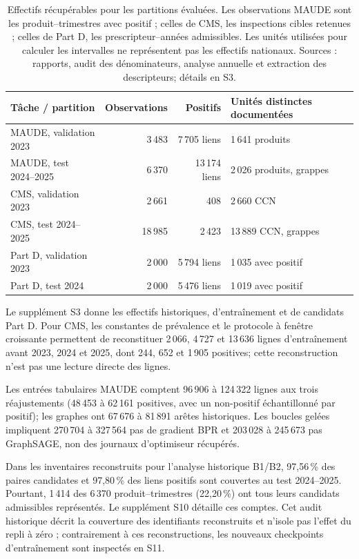 \begin{table}[!htbp]
\centering\footnotesize
\caption{Effectifs récupérables pour les partitions évaluées. Les observations MAUDE sont les produit--trimestres avec positif ; celles de CMS, les inspections cibles retenues ; celles de Part D, les prescripteur--années admissibles. Les unités utilisées pour calculer les intervalles ne représentent pas les effectifs nationaux. Sources : rapports, audit des dénominateurs, analyse annuelle et extraction des descripteurs\cite{hgbresults,hgbanalysis,hgbpartd}; détails en S3.}
\label{tab:population}
\begin{tabularx}{\linewidth}{@{}lrrX@{}}
\toprule
Tâche / partition & Observations & Positifs & Unités distinctes documentées\\
\midrule
MAUDE, validation 2023 & 3\,483 & 7\,705 liens & 1\,641 produits\\
MAUDE, test 2024--2025 & 6\,370 & 13\,174 liens & 2\,026 produits, grappes\\
CMS, validation 2023 & 2\,661 & 408 & 2\,660 CCN\\
CMS, test 2024--2025 & 18\,985 & 2\,423 & 13\,889 CCN, grappes\\
Part D, validation 2023 & 2\,000 & 5\,794 liens & 1\,035 avec positif\\
Part D, test 2024 & 2\,000 & 5\,476 liens & 1\,019 avec positif\\
\bottomrule
\end{tabularx}
\end{table}

Le supplément S3 donne les effectifs historiques, d'entraînement et de candidats Part D. Pour CMS, les constantes de prévalence et le protocole à fenêtre croissante permettent de reconstituer 2\,066, 4\,727 et 13\,636 lignes d'entraînement avant 2023, 2024 et 2025, dont 244, 652 et 1\,905 positives; cette reconstruction n'est pas une lecture directe des lignes.

Les entrées tabulaires MAUDE comptent 96\,906 à 124\,322 lignes aux trois réajustements (48\,453 à 62\,161 positives, avec un non-positif échantillonné par positif); les graphes ont 67\,676 à 81\,891 arêtes historiques. Les boucles gelées impliquent 270\,704 à 327\,564 pas de gradient BPR et 203\,028 à 245\,673 pas GraphSAGE, non des journaux d'optimiseur récupérés.

Dans les inventaires reconstruits pour l'analyse historique B1/B2, 97,56\,\% des paires candidates et 97,80\,\% des liens positifs sont couvertes au test 2024--2025. Pourtant, 1\,414 des 6\,370 produit--trimestres (22,20\,\%) ont tous leurs candidats admissibles représentés. Le supplément S10 détaille ces comptes. Cet audit historique décrit la couverture des identifiants reconstruits et n'isole pas l'effet du repli à zéro ; contrairement à ces reconstructions, les nouveaux checkpoints d'entraînement sont inspectés en S11.

